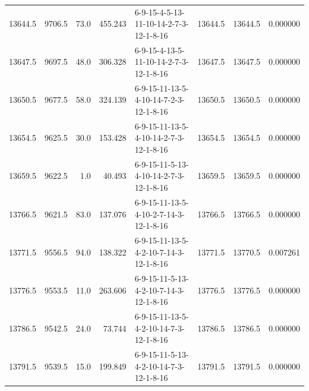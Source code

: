 \begin{tabular}{rrrrlrrr}
 13644.5 &   9706.5 &           73.0 &            455.243 &  6-9-15-4-5-13-11-10-14-2-7-3-12-1-8-16 &       13644.5 &         13644.5 &  0.000000 \\
 13647.5 &   9697.5 &           48.0 &            306.328 &  6-9-15-4-13-5-11-10-14-2-7-3-12-1-8-16 &       13647.5 &         13647.5 &  0.000000 \\
 13650.5 &   9677.5 &           58.0 &            324.139 &  6-9-15-11-13-5-4-10-14-7-2-3-12-1-8-16 &       13650.5 &         13650.5 &  0.000000 \\
 13654.5 &   9625.5 &           30.0 &            153.428 &  6-9-15-11-13-5-4-10-14-2-7-3-12-1-8-16 &       13654.5 &         13654.5 &  0.000000 \\
 13659.5 &   9622.5 &            1.0 &             40.493 &  6-9-15-11-5-13-4-10-14-2-7-3-12-1-8-16 &       13659.5 &         13659.5 &  0.000000 \\
 13766.5 &   9621.5 &           83.0 &            137.076 &  6-9-15-11-13-5-4-10-2-7-14-3-12-1-8-16 &       13766.5 &         13766.5 &  0.000000 \\
 13771.5 &   9556.5 &           94.0 &            138.322 &  6-9-15-11-13-5-4-2-10-7-14-3-12-1-8-16 &       13771.5 &         13770.5 &  0.007261 \\
 13776.5 &   9553.5 &           11.0 &            263.606 &  6-9-15-11-5-13-4-2-10-7-14-3-12-1-8-16 &       13776.5 &         13776.5 &  0.000000 \\
 13786.5 &   9542.5 &           24.0 &             73.744 &  6-9-15-11-13-5-4-2-10-14-7-3-12-1-8-16 &       13786.5 &         13786.5 &  0.000000 \\
 13791.5 &   9539.5 &           15.0 &            199.849 &  6-9-15-11-5-13-4-2-10-14-7-3-12-1-8-16 &       13791.5 &         13791.5 &  0.000000 \\
\bottomrule
\end{tabular}
